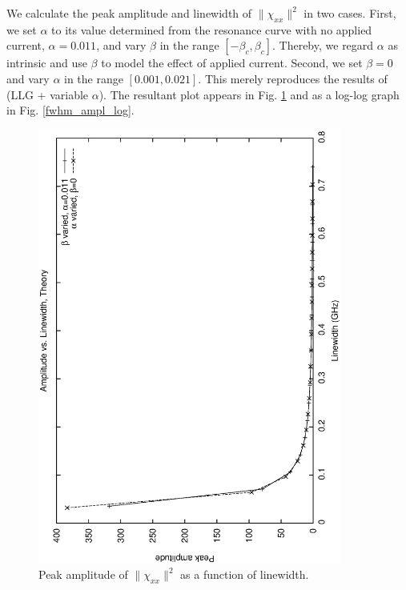 \documentclass{article}
\begin{document}
We calculate the peak amplitude and linewidth of $\| \chi_{xx} \|^2$ in two cases. 
First, we set $\alpha$ to its value determined from the resonance curve with no applied current, $\alpha = 0.011$, and vary $\beta$ in the range $\left[ - \beta_{c}, \beta_{c} \right]$.
Thereby, we regard $\alpha$ as intrinsic and use $\beta$ to model the effect of applied current.
Second, we set $\beta = 0$ and vary $\alpha$ in the range $\left[0.001, 0.021 \right]$.
This merely reproduces the results of (LLG + variable $\alpha$).
The resultant plot appears in Fig. \ref{fwhm_ampl} and as a log-log graph in Fig. \ref{fwhm_ampl_log}.
\begin{figure}
  \centering
  \includegraphics[angle=-90,width=100mm]{fwhm_ampl.eps}
  \caption{Peak amplitude of $\| \chi_{xx} \|^2$ as a function of linewidth. \label{fwhm_ampl}}
\end{figure}
\end{document}
